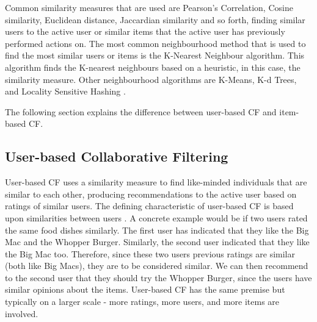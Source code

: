 Common similarity measures that are used are Pearson's Correlation, Cosine similarity, Euclidean distance, Jaccardian similarity and so forth, finding similar users to the active user or similar items that the active user has previously performed actions on. The most common neighbourhood method that is used to find the most similar users or items is the K-Nearest Neighbour algorithm. This algorithm finds the K-nearest neighbours based on a heuristic, in this case, the similarity measure. Other neighbourhood algorithms are K-Means, K-d Trees, and Locality Sensitive Hashing \cite{survey}. 


The following section explains the difference between user-based CF and item-based CF.




\subsection{User-based Collaborative Filtering}

User-based CF uses a similarity measure to find like-minded individuals that are similar to each other, producing recommendations to the active user based on ratings of similar users. The defining characteristic of user-based CF is based upon similarities between users \cite{mahoutaction}. A concrete example would be if two users rated the same food dishes similarly. The first user has indicated that they like the Big Mac and the Whopper Burger. Similarly, the second user indicated that they like the Big Mac too. Therefore, since these two users previous ratings are similar (both like Big Macs), they are to be considered similar. We can then recommend to the second user that they should try the Whopper Burger, since the users have similar opinions about the items. User-based CF has the same premise but typically on a larger scale - more ratings, more users, and more items are involved. 


